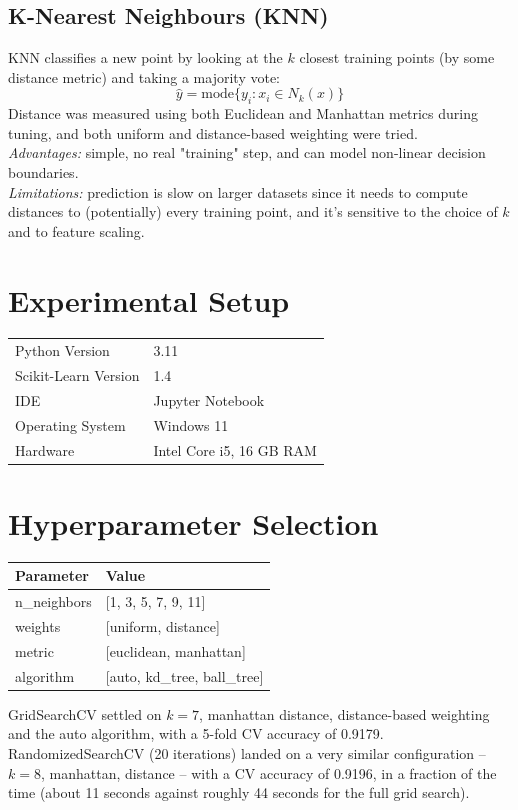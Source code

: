 \documentclass[12pt,a4paper]{article}
\begin{document}
\subsection*{K-Nearest Neighbours (KNN)}
KNN classifies a new point by looking at the $k$ closest training points (by some distance metric) and taking a majority vote:
\[
\hat{y} = \text{mode}\{y_i : x_i \in N_k(x)\}
\]
Distance was measured using both Euclidean and Manhattan metrics during tuning, and both uniform and distance-based weighting were tried.\\
\textit{Advantages:} simple, no real "training" step, and can model non-linear decision boundaries.\\
\textit{Limitations:} prediction is slow on larger datasets since it needs to compute distances to (potentially) every training point, and it's sensitive to the choice of $k$ and to feature scaling.

\section{Experimental Setup}
\begin{tabular}{ll}
\toprule
Python Version & 3.11 \\
Scikit-Learn Version & 1.4 \\
IDE & Jupyter Notebook \\
Operating System & Windows 11 \\
Hardware & Intel Core i5, 16 GB RAM \\
\bottomrule
\end{tabular}

\section{Hyperparameter Selection}

\begin{tabular}{ll}
\toprule
Parameter & Value\\
\midrule
n\_neighbors & [1, 3, 5, 7, 9, 11] \\
weights & [uniform, distance] \\
metric & [euclidean, manhattan] \\
algorithm & [auto, kd\_tree, ball\_tree] \\
\bottomrule
\end{tabular}

GridSearchCV settled on $k=7$, manhattan distance, distance-based weighting and the auto algorithm, with a 5-fold CV accuracy of 0.9179. RandomizedSearchCV (20 iterations) landed on a very similar configuration -- $k=8$, manhattan, distance -- with a CV accuracy of 0.9196, in a fraction of the time (about 11 seconds against roughly 44 seconds for the full grid search).
\end{document}
